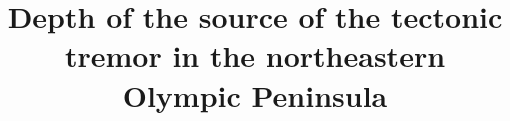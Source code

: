 \documentclass[draft]{agujournal2019}
\begin{document}
%
%


\title{Depth of the source of the tectonic tremor in the northeastern Olympic Peninsula}

%
%











\end{document}
